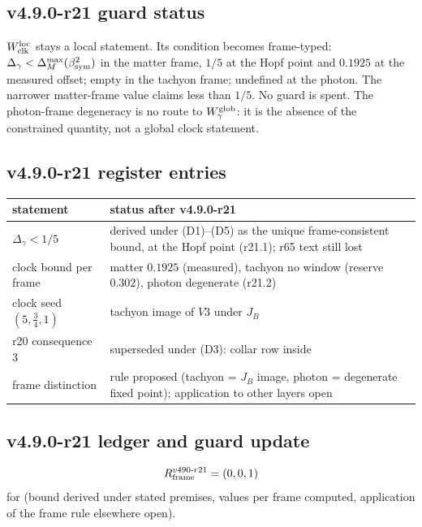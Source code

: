\subsection*{v4.9.0-r21 guard status}
\label{subsec:v490-r21-guard}

\(W_{\rm clk}^{\rm loc}\) stays a local statement.  Its condition becomes frame-typed: \(\Delta_\gamma<\Delta_M^{\max}(\beta_{\mathrm{sym}}^2)\) in the
matter frame, \(1/5\) at the Hopf point and \(0.1925\) at the measured offset; empty in the tachyon frame; undefined at the
photon.  The narrower matter-frame value claims less than \(1/5\).  No guard is spent.  The photon-frame degeneracy is no route
to \(W_\gamma^{\rm glob}\): it is the absence of the constrained quantity, not a global clock statement.

\subsection*{v4.9.0-r21 register entries}
\label{subsec:v490-r21-register}

\begin{center}
\small
\begin{tabular}{@{}>{\raggedright\arraybackslash}p{}>{\raggedright\arraybackslash}p{}@{}}
\toprule
statement & status after v4.9.0-r21\\
\midrule
\(\Delta_\gamma<1/5\) & derived under (D1)--(D5) as the unique frame-consistent bound, at the Hopf point (r21.1); r65 text still lost\\
clock bound per frame & matter \(0.1925\) (measured), tachyon no window (reserve \(0.302\)), photon degenerate (r21.2)\\
clock seed \((5,\tfrac34,1)\) & tachyon image of \(V3\) under \(J_B\)\\
r20 consequence 3 & superseded under (D3): collar row inside\\
frame distinction & rule proposed (tachyon = \(J_B\) image, photon = degenerate fixed point); application to other layers open\\
\bottomrule
\end{tabular}
\end{center}

\subsection*{v4.9.0-r21 ledger and guard update}
\label{subsec:v490-r21-ledger-guard}

\[
R_{\rm frame}^{v490\text{-}r21}=(0,0,1)
\]
for (bound derived under stated premises, values per frame computed, application of the frame rule elsewhere open).

